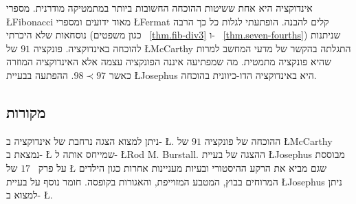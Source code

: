 אינדוקציה היא אחת ששיטות ההוכחה החשובות ביותר במתמטיקה מודרנית. מספרי
\L{Fibonacci}
מאוד ידועים ומספרי 
\L{Fermat}
קלים להבנה. הופתעתי לגלות כל כך הרבה נוסחאות שלא היכרתי (כגון משפטים%
~\ref{thm.fib-div3}
ו-%
~\ref{thm.seven-fourths})
שניתנות להוכחה באינדוקציה. פונקציה
$91$
של
\L{McCarthy}
התגלתה בהקשר של מדעי המחשב למרות שהיא פונקציה מתמטית. מה שמפתיעה איננה הפונקציה עצמה אלא האינדוקציה המוזרה כאשר 
$98\prec 97$. 
ההפתעה בבעיית
\L{Josephus}
היא באינדוקציה הדו-כיוונית בהוכחה.

\subsection*{מקורות}

ניתן למצוא הצגה נרחבת של אינדוקציה ב-%
\L{\cite{gunderson}}.
ההוכחה של פונקציה 
$91$
של
\L{McCarthy}
נמצאת ב-%
\L{\cite{manna}}
שמייחס אותה ל-%
\L{Rod M. Burstall}.
ההצגה של בעיית 
\L{Josephus}
מבוססת על פרק~
$17$
של
\L{\cite{gunderson}}
שגם מביא את הרקע ההיסטורי ובעיות מעניינות אחרות כגון הילדים המרוחים בבוץ, המטבע המזוייפת, והאגורות בקופסה. חומר נוסף על בעיית
\L{Josephus}
ניתן למצוא ב-%
\L{\cite{schumer,wiki:josephus}}.
